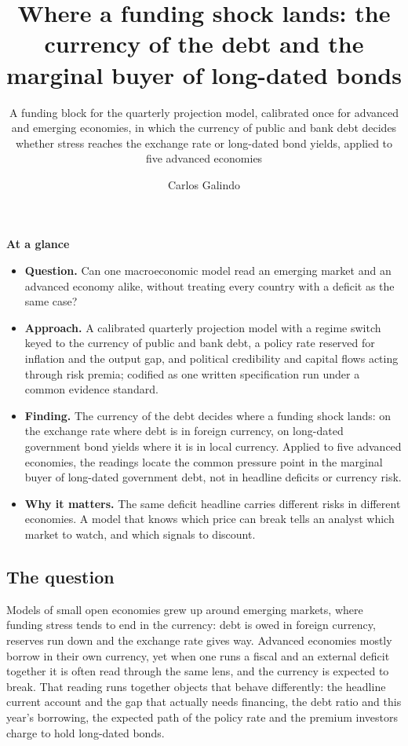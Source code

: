 \documentclass[
  british,
  a4paper,
]{article}
\title{Where a funding shock lands: the currency of the debt and the
marginal buyer of long-dated bonds}
\subtitle{A funding block for the quarterly projection model, calibrated
once for advanced and emerging economies, in which the currency of
public and bank debt decides whether stress reaches the exchange rate or
long-dated bond yields, applied to five advanced economies}
\author{Carlos Galindo}
\date{}
\providecommand{\tightlist}{%
  \setlength{\itemsep}{0pt}\setlength{\parskip}{0pt}}
\begin{document}
\maketitle


\begin{tcolorbox}[enhanced jigsaw, arc=.35mm, bottomrule=.15mm, breakable, colback=white, colframe=quarto-callout-note-color-frame, left=2mm, leftrule=.75mm, opacityback=0, rightrule=.15mm, toprule=.15mm]

\vspace{-3mm}\textbf{At a glance}\vspace{3mm}

\begin{itemize}
\tightlist
\item
  \textbf{Question.} Can one macroeconomic model read an emerging market
  and an advanced economy alike, without treating every country with a
  deficit as the same case?
\item
  \textbf{Approach.} A calibrated quarterly projection model with a
  regime switch keyed to the currency of public and bank debt, a policy
  rate reserved for inflation and the output gap, and political
  credibility and capital flows acting through risk premia; codified as
  one written specification run under a common evidence standard.
\item
  \textbf{Finding.} The currency of the debt decides where a funding
  shock lands: on the exchange rate where debt is in foreign currency,
  on long-dated government bond yields where it is in local currency.
  Applied to five advanced economies, the readings locate the common
  pressure point in the marginal buyer of long-dated government debt,
  not in headline deficits or currency risk.
\item
  \textbf{Why it matters.} The same deficit headline carries different
  risks in different economies. A model that knows which price can break
  tells an analyst which market to watch, and which signals to discount.
\end{itemize}

\end{tcolorbox}

\subsection{The question}\label{the-question}

Models of small open economies grew up around emerging markets, where
funding stress tends to end in the currency: debt is owed in foreign
currency, reserves run down and the exchange rate gives way. Advanced
economies mostly borrow in their own currency, yet when one runs a
fiscal and an external deficit together it is often read through the
same lens, and the currency is expected to break. That reading runs
together objects that behave differently: the headline current account
and the gap that actually needs financing, the debt ratio and this
year's borrowing, the expected path of the policy rate and the premium
investors charge to hold long-dated bonds.
\end{document}
